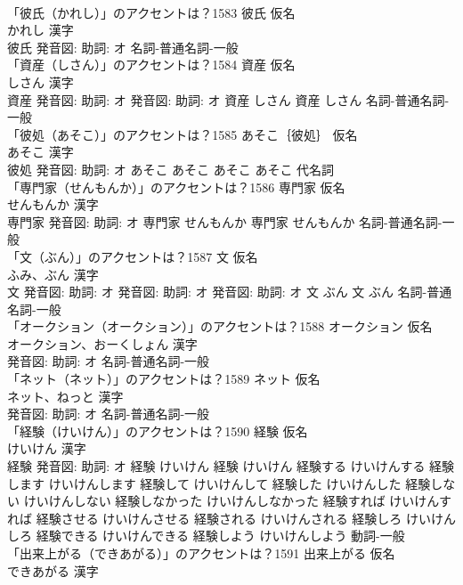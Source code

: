 \documentclass[8pt]{extreport}
\begin{document}
\begin{CJK}{UTF8}{min}
\\	「彼氏（かれし）」のアクセントは？1583	彼氏 仮名　
\\	かれし 漢字　
\\	彼氏 発音図: 助詞: オ							名詞-普通名詞-一般 
\\	「資産（しさん）」のアクセントは？1584	資産 仮名　
\\	しさん 漢字　
\\	資産 発音図: 助詞: オ 発音図: 助詞: オ	資産 しさん		資産 しさん				名詞-普通名詞-一般 
\\	「彼処（あそこ）」のアクセントは？1585	あそこ｛彼処｝ 仮名　
\\	あそこ 漢字　
\\	彼処 発音図: 助詞: オ	あそこ あそこ		あそこ あそこ				代名詞 
\\	「専門家（せんもんか）」のアクセントは？1586	専門家 仮名　
\\	せんもんか 漢字　
\\	専門家 発音図: 助詞: オ	専門家 せんもんか		専門家 せんもんか				名詞-普通名詞-一般 
\\	「文（ぶん）」のアクセントは？1587	文 仮名　
\\	ふみ、ぶん 漢字　
\\	文 発音図: 助詞: オ 発音図: 助詞: オ 発音図: 助詞: オ	文 ぶん		文 ぶん				名詞-普通名詞-一般 
\\	「オークション（オークション）」のアクセントは？1588	オークション 仮名　
\\	オークション、おーくしょん 漢字　
\\	発音図: 助詞: オ							名詞-普通名詞-一般 
\\	「ネット（ネット）」のアクセントは？1589	ネット 仮名　
\\	ネット、ねっと 漢字　
\\	発音図: 助詞: オ							名詞-普通名詞-一般 
\\	「経験（けいけん）」のアクセントは？1590	経験 仮名　
\\	けいけん 漢字　
\\	経験 発音図: 助詞: オ	経験 けいけん		経験 けいけん 経験する けいけんする 経験します けいけんします 経験して けいけんして 経験した けいけんした 経験しない けいけんしない 経験しなかった けいけんしなかった 経験すれば けいけんすれば 経験させる けいけんさせる 経験される けいけんされる 経験しろ けいけんしろ 経験できる けいけんできる 経験しよう けいけんしよう				動詞-一般 
\\	「出来上がる（できあがる）」のアクセントは？1591	出来上がる 仮名　
\\	できあがる 漢字　

\end{CJK}
\end{document}
